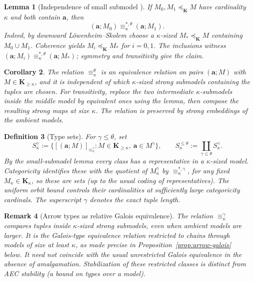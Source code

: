 \documentclass[11pt]{article}
\newcommand{\K}{\mathbf K}
\newcommand{\ba}{\mathbf{a}}
\theoremstyle{plain}
\newtheorem{definition}{Definition}[section]
\newtheorem{lemma}[definition]{Lemma}
\newtheorem{corollary}[definition]{Corollary}
\newtheorem{remark}[definition]{Remark}
\begin{document}
\begin{lemma}[Independence of small submodel {\cite[Lemma 4.1]{oai-ecc}}]\label{lem:small}
If $M_0,M_1\preccurlyeq_\K M$ have cardinality $\kappa$ and both contain $\ba$, then
\[
(\ba;M_0)\equiv^{*,\theta}_\kappa(\ba;M_1).
\]
Indeed, by downward L\"owenheim--Skolem choose a $\kappa$-sized $M_*\preccurlyeq_\K M$ containing $M_0\cup M_1$. Coherence yields $M_i\preccurlyeq_\K M_*$ for $i=0,1$. The inclusions witness
$(\ba;M_i)\equiv^{*,\theta}_\kappa(\ba;M_*)$; symmetry and transitivity give the claim.
\end{lemma}

\begin{corollary}
The relation $\equiv^\theta_\kappa$ is an equivalence relation on pairs $(\ba;M)$ with $M\in\K_{\geq\kappa}$, and it is independent of which $\kappa$-sized strong submodels containing the tuples are chosen. For transitivity, replace the two intermediate $\kappa$-submodels inside the middle model by equivalent ones using the lemma, then compose the resulting strong maps at size $\kappa$. The relation is preserved by strong embeddings of the ambient models.
\end{corollary}

\begin{definition}[Type sets]
For $\gamma\leq\theta$, set
\[
S^\gamma_\kappa:=\bigl\{[(\ba;M)]_{\equiv^\gamma_\kappa}: M\in\K_{\geq\kappa},\ \ba\in M^\gamma\bigr\},
\qquad
S^{\leq\theta}_\kappa:=\coprod_{\gamma\leq\theta}S^\gamma_\kappa.
\]
By the small-submodel lemma every class has a representative in a $\kappa$-sized model. Categoricity identifies these with the quotient of $M_\kappa^\gamma$ by $\equiv^{*,\gamma}_\kappa$, for any fixed $M_\kappa\in\K_\kappa$, so these are sets (up to the usual coding of representatives). The uniform orbit bound controls their cardinalities at sufficiently large categoricity cardinals. The superscript $\gamma$ denotes the \emph{exact} tuple length.
\end{definition}

\begin{remark}[Arrow types as relative Galois equivalence]
The relation $\equiv_\kappa^\gamma$ compares
tuples inside $\kappa$-sized strong submodels,
even when ambient models are larger.
It is the Galois-type equivalence relation
\emph{restricted to chains through models of size
at least $\kappa$}, as made precise in
Proposition~\ref{prop:arrow-galois} below.
It need not coincide with the usual unrestricted
Galois equivalence in the absence of amalgamation.
Stabilization of these restricted classes is
distinct from AEC stability (a bound on types
over a model).
\end{remark}
\end{document}

